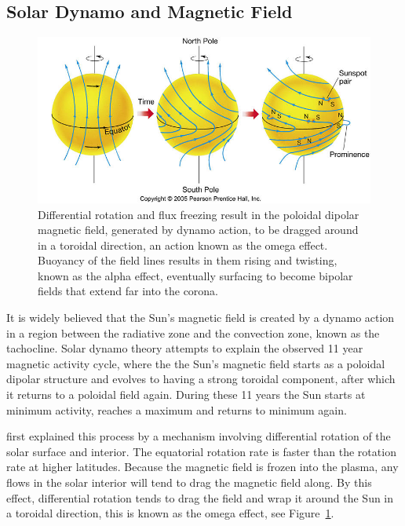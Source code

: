 \subsection{Solar Dynamo and Magnetic Field}\label{sec:11}

\begin{figure}[!h]
\begin{center}
\includegraphics[]{images/Babcock}
\caption{Differential rotation and flux freezing result in the poloidal dipolar magnetic field, generated by dynamo action, to be dragged around in a toroidal direction, an action known as the omega effect. Buoyancy of the field lines results in them rising and twisting, known as the alpha effect, eventually surfacing to become bipolar fields that extend far into the corona.}
\label{fig:Babcock} 
\end{center}
\end{figure}

It is widely believed that the Sun's magnetic field is created by a dynamo action in a region between the radiative zone and the convection zone, known as the tachocline. Solar dynamo theory attempts to explain the observed 11 year magnetic activity cycle, where the the Sun's magnetic field starts as a poloidal dipolar structure and evolves to having a strong toroidal component, after which it returns to a poloidal field again. During these 11 years the Sun starts at minimum activity, reaches a maximum and returns to minimum again.

\citet{babcock1961} first explained this process by a mechanism involving differential rotation of the solar surface and interior. The equatorial rotation rate is faster than the rotation rate at higher latitudes. Because the magnetic field is frozen into the plasma, any flows in the solar interior will tend to drag the magnetic field along. By this effect, differential rotation tends to drag the field and wrap it around the Sun in a toroidal direction, this is known as the omega effect, see Figure~\ref{fig:Babcock}.

